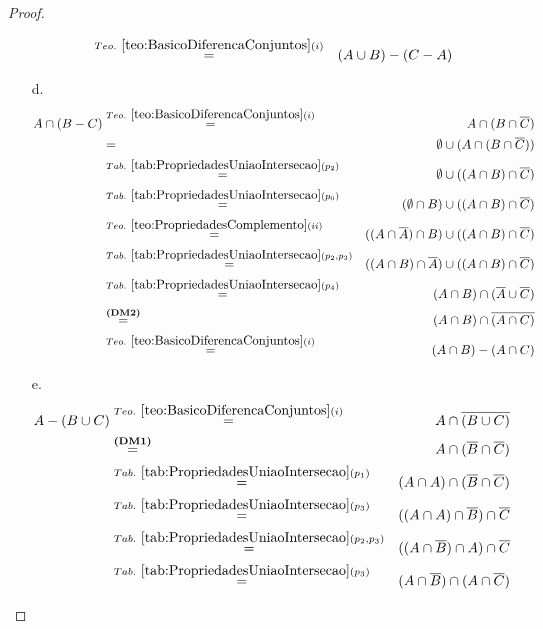 \begin{proof}
\begin{itemize}
\begin{eqnarray*}
			& \stackrel{Teo. \  \ref{teo:BasicoDiferencaConjuntos}(i)}{=}& (A \cup B) - (C - A)\\
		\end{eqnarray*}
		\item[d.]
		\begin{eqnarray*}
			A \cap (B - C) & \stackrel{Teo. \  \ref{teo:BasicoDiferencaConjuntos}(i)}{=}& A \cap (B \cap \overline{C})\\
			& = & \emptyset \cup ( A \cap (B \cap \overline{C}))\\
			& \stackrel{Tab. \ \ref{tab:PropriedadesUniaoIntersecao}(p_2)}{=} & \emptyset \cup ( (A \cap B) \cap \overline{C})\\
			& \stackrel{Tab. \ \ref{tab:PropriedadesUniaoIntersecao}(p_6)}{=} & (\emptyset \cap B) \cup ( (A \cap B) \cap \overline{C})\\
			& \stackrel{Teo. \ \ref{teo:PropriedadesComplemento}(ii)}{=} & ((A \cap \overline{A}) \cap B) \cup ( (A \cap B) \cap \overline{C})\\
			& \stackrel{Tab. \ \ref{tab:PropriedadesUniaoIntersecao}(p_2, p_3)}{=} & ((A \cap B) \cap \overline{A}) \cup ( (A \cap B) \cap \overline{C})\\
			& \stackrel{Tab. \ \ref{tab:PropriedadesUniaoIntersecao}(p_4)}{=}& (A \cap B) \cap (\overline{A} \cup \overline{C})\\
			& \stackrel{\textbf{(DM2)}}{=}& (A \cap B) \cap \overline{(A \cap C)}\\
			& \stackrel{Teo. \  \ref{teo:BasicoDiferencaConjuntos}(i)}{=}& (A \cap B) - (A \cap C)
		\end{eqnarray*}
		\item[e.]
		\begin{eqnarray*}
			A - (B \cup C) & \stackrel{Teo. \  \ref{teo:BasicoDiferencaConjuntos}(i)}{=}& A \cap \overline{(B \cup C)}\\
			& \stackrel{\textbf{(DM1)}}{=}& A \cap (\overline{B} \cap \overline{C})\\
			& \stackrel{Tab. \ \ref{tab:PropriedadesUniaoIntersecao}(p_1)}{=}& (A \cap A) \cap (\overline{B} \cap \overline{C})\\
			& \stackrel{Tab. \ \ref{tab:PropriedadesUniaoIntersecao}(p_3)}{=}& ((A \cap A) \cap \overline{B}) \cap \overline{C}\\
			& \stackrel{Tab. \ \ref{tab:PropriedadesUniaoIntersecao}(p_2, p_3)}{=}& ((A \cap \overline{B}) \cap A) \cap \overline{C}\\
			& \stackrel{Tab. \ \ref{tab:PropriedadesUniaoIntersecao}(p_3)}{=}& (A \cap \overline{B}) \cap (A \cap \overline{C})\\

\end{eqnarray*}
\end{itemize}
\end{proof}
